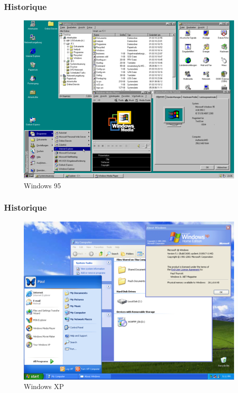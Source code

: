 \documentclass[aspectratio=169]{beamer}
\begin{document}
\begin{frame}
  \frametitle{Historique}
  \begin{figure}[!h]
    \center
    \includegraphics[scale=0.245]
    {textures/images/windows/historic/Win95.png}
    \caption{Windows 95}
  \end{figure}
\end{frame}

\begin{frame}
  \frametitle{Historique}
  \begin{figure}[!h]
    \center
    \includegraphics[scale=0.27]
    {textures/images/windows/historic/WinXP.png}
    \caption{Windows XP}
  \end{figure}
\end{frame}
\end{document}
